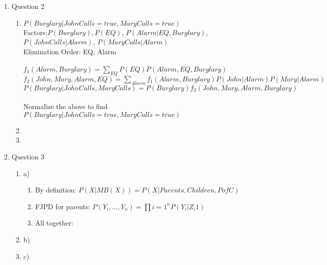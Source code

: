 \documentclass[11pt]{article}
\begin{document}
\begin{enumerate}
\begin{enumerate}
\end{enumerate}

\item Question 2
\begin{enumerate}
\item $P(Burglary|JohnCalls = true, MaryCalls = true)$
\\Factors:$ P(Burglary), P(EQ)$, $P(Alarm|EQ, Burglary)$,$ P(JohnCalls|Alarm)$, $P(MaryCalls|Alarm)$
\\Elimination Order: EQ, Alarm
\\
\\$f_{1}(Alarm, Burglary) = \sum_{EQ} P(EQ) P(Alarm, EQ, Burglary)$
\\$f_{2}(John, Mary, Alarm, EQ) = \sum_{Alarm}f_{1}(Alarm,Burglary)P(John|Alarm)P(Mary|Alarm)$
\\$P(Burglary|JohnCalls,MaryCalls) = P(Burglary)f_{2}(John, Mary, Alarm, Burglary)$
\\
\\Normalize the above to find $P(Burglary|JohnCalls = true, MaryCalls = true)$
\item
\item
\end {enumerate}

\item Question 3
\begin{enumerate}
\item a) 
\begin{enumerate}
\item By definition: $P(X|MB(X)) = P(X|Parents,Children,PofC) $
\item FJPD for parents: $P(Y_i, ..., Y_n) = \prod{i = 1}^{n} P(Y_i | Z_{i}1)$ 
\item All together: 
\end{enumerate}
\item b)
\item c)
\end{enumerate}


\end{enumerate}
\end{document}
